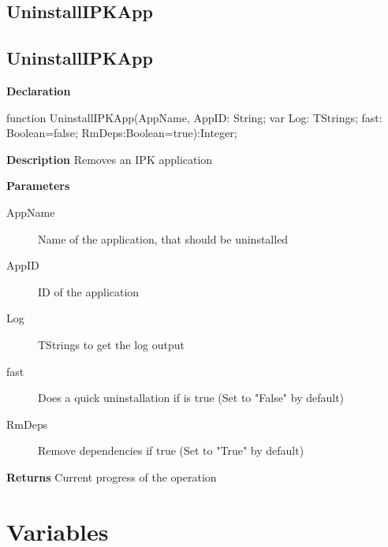 \documentclass{report}
\newif\ifpdf
\begin{document}
\subsection*{\large{\textbf{UninstallIPKApp}}\normalsize\hspace{1ex}\hrulefill}
\else
\subsection*{UninstallIPKApp}
\fi
\label{ipkhandle-UninstallIPKApp}
\begin{list}{}{
\setlength{\itemindent}{0cm}
\setlength{\listparindent}{0cm}
\setlength{\leftmargin}{\evensidemargin}
\addtolength{\leftmargin}{\tmplength}
\settowidth{\labelsep}{X}
\addtolength{\leftmargin}{\labelsep}
\setlength{\labelwidth}{\tmplength}
}
\item[\textbf{Declaration}\hfill]
\ifpdf
\begin{flushleft}
\fi
\begin{ttfamily}
function UninstallIPKApp(AppName, AppID: String; var Log: TStrings; fast: Boolean=false; RmDeps:Boolean=true):Integer;\end{ttfamily}

\ifpdf
\end{flushleft}
\fi

\par
\item[\textbf{Description}]
Removes an IPK application      \par
\item[\textbf{Parameters}]
\begin{description}
\item[AppName] Name of the application, that should be uninstalled
\item[AppID] ID of the application
\item[Log] TStrings to get the log output
\item[fast] Does a quick uninstallation if is true (Set to "False" by default)
\item[RmDeps] Remove dependencies if true (Set to "True" by default)
\end{description}
\item[\textbf{Returns}]Current progress of the operation


\end{list}
\section{Variables}
\ifpdf
\end{document}
